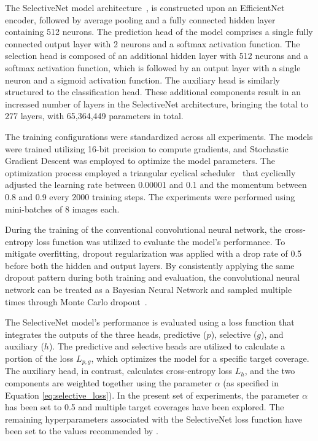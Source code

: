 The SelectiveNet model architecture~\citep{geifman2019selectivenet}, is constructed upon an EfficientNet encoder, followed by average pooling and a fully connected hidden layer containing 512 neurons. The prediction head of the model comprises a single fully connected output layer with 2 neurons and a softmax activation function. The selection head is composed of an additional hidden layer with 512 neurons and a softmax activation function, which is followed by an output layer with a single neuron and a sigmoid activation function. The auxiliary head is similarly structured to the classification head. These additional components result in an increased number of layers in the SelectiveNet architecture, bringing the total to 277 layers, with 65,364,449 parameters in total.

The training configurations were standardized across all experiments. The models were trained utilizing 16-bit precision to compute gradients, and Stochastic Gradient Descent was employed to optimize the model parameters. The optimization process employed a triangular cyclical scheduler~\citep{smith2017cyclical} that cyclically adjusted the learning rate between 0.00001 and 0.1 and the momentum between 0.8 and 0.9 every 2000 training steps. The experiments were performed using mini-batches of 8 images each.

During the training of the conventional convolutional neural network, the cross-entropy loss function was utilized to evaluate the model's performance. To mitigate overfitting, dropout regularization was applied with a drop rate of 0.5 before both the hidden and output layers. By consistently applying the same dropout pattern during both training and evaluation, the convolutional neural network can be treated as a Bayesian Neural Network and sampled multiple times through Monte Carlo dropout~\citep{gal2016dropout}.

The SelectiveNet model's performance is evaluated using a loss function that integrates the outputs of the three heads, predictive ($p$), selective ($g$), and auxiliary ($h$). The predictive and selective heads are utilized to calculate a portion of the loss $L_{p,g}$, which optimizes the model for a specific target coverage. The auxiliary head, in contrast, calculates cross-entropy loss $L_h$, and the two components are weighted together using the parameter $\alpha$ (as specified in Equation \ref{eq:selective_loss}). In the present set of experiments, the parameter $\alpha$ has been set to 0.5 and multiple target coverages have been explored. The remaining hyperparameters associated with the SelectiveNet loss function have been set to the values recommended by \cite{geifman2019selectivenet}.

